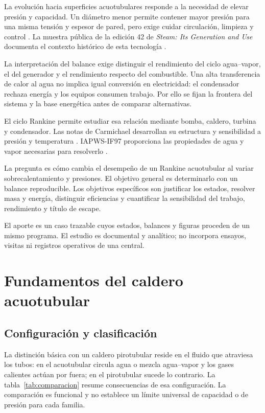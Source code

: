 \documentclass[conference,a4paper,11pt]{IEEEtran}
\begin{document}
La evolución hacia superficies acuotubulares responde a la necesidad de elevar presión y capacidad. Un diámetro menor permite contener mayor presión para una misma tensión y espesor de pared, pero exige cuidar circulación, limpieza y control \cite{spirax_tubos}. La muestra pública de la edición 42 de \emph{Steam: Its Generation and Use} documenta el contexto histórico de esta tecnología \cite{babcock}.

La interpretación del balance exige distinguir el rendimiento del ciclo agua--vapor, el del generador y el rendimiento respecto del combustible. Una alta transferencia de calor al agua no implica igual conversión en electricidad: el condensador rechaza energía y los equipos consumen trabajo. Por ello se fijan la frontera del sistema y la base energética antes de comparar alternativas.

El ciclo Rankine permite estudiar esa relación mediante bomba, caldero, turbina y condensador. Las notas de Carmichael desarrollan su estructura y sensibilidad a presión y temperatura \cite{mit_rankine,mit_parametros}. IAPWS-IF97 proporciona las propiedades de agua y vapor necesarias para resolverlo \cite{iapws}.

La pregunta es cómo cambia el desempeño de un Rankine acuotubular al variar sobrecalentamiento y presiones. El objetivo general es determinarlo con un balance reproducible. Los objetivos específicos son justificar los estados, resolver masa y energía, distinguir eficiencias y cuantificar la sensibilidad del trabajo, rendimiento y título de escape.

El aporte es un caso trazable cuyos estados, balances y figuras proceden de un mismo programa. El estudio es documental y analítico; no incorpora ensayos, visitas ni registros operativos de una central.

\section{Fundamentos del caldero acuotubular}
\subsection{Configuración y clasificación}
La distinción básica con un caldero pirotubular reside en el fluido que atraviesa los tubos: en el acuotubular circula agua o mezcla agua--vapor y los gases calientes actúan por fuera; en el pirotubular sucede lo contrario. La tabla~\ref{tab:comparacion} resume consecuencias de esa configuración. La comparación es funcional y no establece un límite universal de capacidad o de presión para cada familia.
\end{document}
